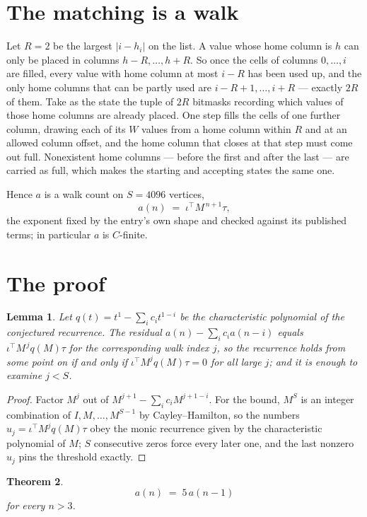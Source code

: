 \documentclass[11pt,a4paper]{article}
\theoremstyle{plain}
\newtheorem{theorem}{Theorem}
\newtheorem{lemma}[theorem]{Lemma}
\theoremstyle{definition}
\begin{document}
\section{The matching is a walk}

Let $R=2$ be the largest $|i-h_i|$ on the list. A value whose home column is $h$ can only be
placed in columns $h-R,\dots,h+R$. So once the cells of columns $0,\dots,i$ are filled, every
value with home column at most $i-R$ has been used up, and the only home columns that can be
partly used are $i-R+1,\dots,i+R$ --- exactly $2R$ of them. Take as the state the tuple of
$2R$ bitmasks recording which values of those home columns are already placed. One step fills
the cells of one further column, drawing each of its $W$ values from a home column within $R$
and at an allowed column offset, and the home column that closes at that step must come out
full. Nonexistent home columns --- before the first and after the last --- are carried as
full, which makes the starting and accepting states the same one.

Hence $a$ is a walk count on $S=4096$ vertices,
\[
a(n)\;=\;\iota^{\!\top}M^{\,n+1}\tau ,
\]
the exponent fixed by the entry's own shape and checked against its published terms; in
particular $a$ is $C$-finite.

\section{The proof}

\begin{lemma}\label{lem:crit}
Let $q(t)=t^{1}-\sum_i c_it^{1-i}$ be the characteristic polynomial of the
conjectured recurrence. The residual $a(n)-\sum_ic_ia(n-i)$ equals
$\iota^{\!\top}M^{\,j}q(M)\tau$ for the corresponding walk index $j$, so the recurrence
holds from some point on if and only if $\iota^{\!\top}M^{j}q(M)\tau=0$ for all large $j$;
and it is enough to examine $j<S$.
\end{lemma}

\begin{proof}
Factor $M^{j}$ out of $M^{j+1}-\sum_ic_iM^{j+1-i}$. For the bound, $M^{S}$
is an integer combination of $I,M,\dots,M^{S-1}$ by Cayley--Hamilton, so the numbers
$u_j=\iota^{\!\top}M^{j}q(M)\tau$ obey the monic recurrence given by the characteristic
polynomial of $M$; $S$ consecutive zeros force every later one, and the last nonzero $u_j$
pins the threshold exactly.
\end{proof}

\begin{theorem}
\[
a(n)\;=\;5\,a(n-1)
\]
for every $n>3$.
\end{theorem}
\end{document}
